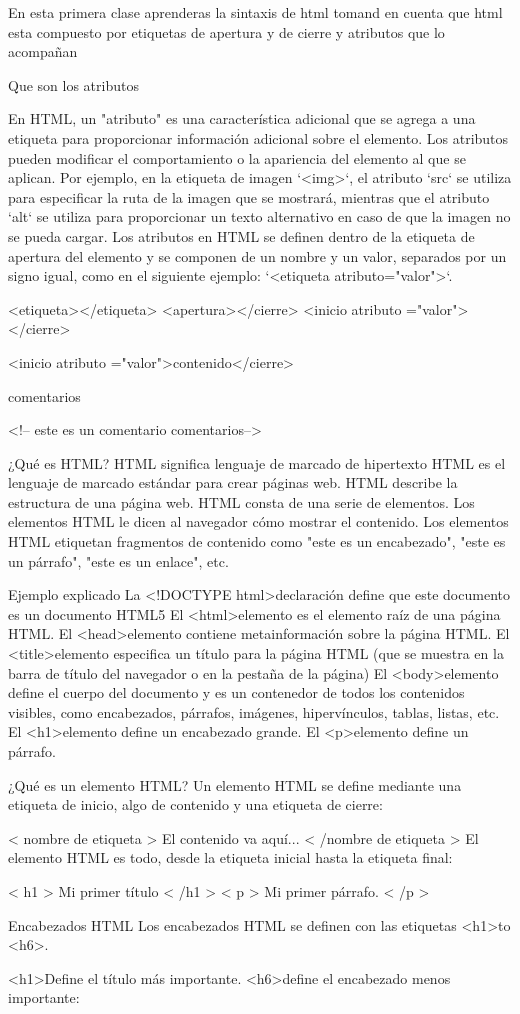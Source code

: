 En esta primera clase aprenderas la sintaxis de html tomand en cuenta que html
 esta compuesto por etiquetas
 de apertura y de cierre y atributos que lo acompañan 


 Que son los atributos

 En HTML, un "atributo" es una característica adicional que se agrega
  a una etiqueta para proporcionar información adicional sobre el elemento.
   Los atributos pueden modificar el comportamiento o la apariencia del elemento 
   al que se aplican. Por ejemplo, en la etiqueta de imagen `<img>`, el atributo
    `src` se utiliza para especificar la ruta de la imagen que se mostrará, 
    mientras que el atributo `alt` se utiliza para proporcionar un texto 
    alternativo en caso de que la imagen no se pueda cargar. Los atributos 
    en HTML se definen dentro de la etiqueta de apertura del elemento y se
     componen de un nombre y un valor, separados por un signo igual, como 
     en el siguiente ejemplo: `<etiqueta atributo="valor">`.

     <etiqueta></etiqueta>
     <apertura></cierre>
     <inicio atributo ="valor"></cierre>

     <inicio atributo ="valor">contenido</cierre>

     comentarios 

     <!-- este es un comentario comentarios-->

     ¿Qué es HTML?
HTML significa lenguaje de marcado de hipertexto
HTML es el lenguaje de marcado estándar para crear páginas web.
HTML describe la estructura de una página web.
HTML consta de una serie de elementos.
Los elementos HTML le dicen al navegador cómo mostrar el contenido.
Los elementos HTML etiquetan fragmentos de contenido como "este es un encabezado", "este es un párrafo", "este es un enlace", etc.




Ejemplo explicado
La <!DOCTYPE html>declaración define que este documento es un documento HTML5
El <html>elemento es el elemento raíz de una página HTML.
El <head>elemento contiene metainformación sobre la página HTML.
El <title>elemento especifica un título para la página HTML (que se muestra en la barra de título del navegador o en la pestaña de la página)
El <body>elemento define el cuerpo del documento y es un contenedor de todos los contenidos visibles, como encabezados, párrafos, imágenes, hipervínculos, tablas, listas, etc.
El <h1>elemento define un encabezado grande.
El <p>elemento define un párrafo.

¿Qué es un elemento HTML?
Un elemento HTML se define mediante una etiqueta de inicio, algo de contenido y una etiqueta de cierre:

< nombre de etiqueta > El contenido va aquí... < /nombre de etiqueta >
El elemento HTML es todo, desde la etiqueta inicial hasta la etiqueta final:

< h1 > Mi primer título < /h1 >
< p > Mi primer párrafo. < /p >

Encabezados HTML
Los encabezados HTML se definen con las etiquetas <h1>to <h6>.

<h1>Define el título más importante. <h6>define el encabezado menos importante: 
     


